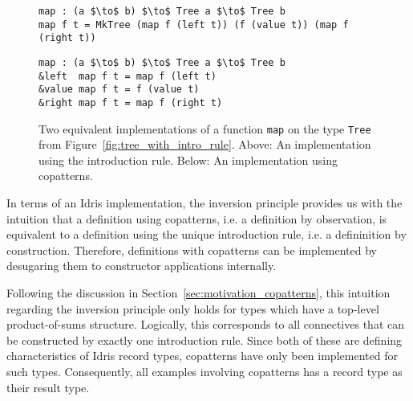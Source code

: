 \begin{figure}[h]
\begin{lstlisting}[mathescape]
map : (a $\to$ b) $\to$ Tree a $\to$ Tree b
map f t = MkTree (map f (left t)) (f (value t)) (map f (right t))
\end{lstlisting}
\begin{lstlisting}[mathescape]
map : (a $\to$ b) $\to$ Tree a $\to$ Tree b
&left  map f t = map f (left t)
&value map f t = f (value t)
&right map f t = map f (right t)  
\end{lstlisting}
  
  \caption{Two equivalent implementations of a function \texttt{map} on the type
    \texttt{Tree} from Figure~\ref{fig:tree_with_intro_rule}. Above: An
    implementation using the introduction rule. Below: An implementation using copatterns.}
  \label{fig:map_tree_implementations_equiv}
\end{figure}

In terms of an Idris implementation, the inversion principle provides us with
the intuition that a definition using copatterns, i.e. a definition by
observation, is equivalent to a definition using the unique introduction rule,
i.e. a defininition by construction. Therefore, definitions with copatterns can
be implemented by desugaring them to constructor applications internally.

Following the discussion in Section~\ref{sec:motivation_copatterns},
this intuition regarding the inversion principle only holds for types which
have a top-level product-of-sums structure. Logically, this corresponds to all
connectives that can be constructed by exactly one introduction rule. Since both of
these are defining characteristics of Idris record types, copatterns have only
been implemented for such types. Consequently, all examples involving copatterns
has a record type as their result type.

